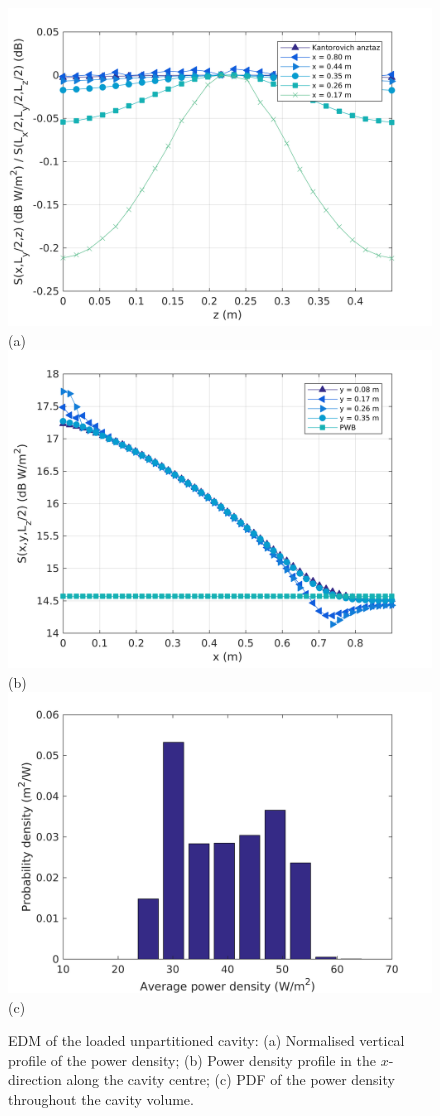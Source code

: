 \documentclass[a4paper]{article}
\numberwithin{equation}{section}
\begin{document}
\begin{figure}[ht]
\begin{center}
\includegraphics[width=0.6\linewidth]{figures/SDM_3D_SL_PowerDensityProfileZ}\\
{\footnotesize (a)}\\
\vspace{2mm}
\includegraphics[width=0.6\linewidth]{figures/SDM_3D_SL_PowerDensityProfileX}\\
{\footnotesize (b)}\\
\vspace{2mm}
\includegraphics[width=0.6\linewidth]{figures/SDM_3D_SL_PowerDensityPDF}\\
{\footnotesize (c)}\\
\vspace{-2mm}
\caption{\label{fg:unpartcyl_profs} EDM of the loaded unpartitioned cavity: (a) Normalised vertical profile of the power density; 
(b) Power density profile in the $x$-direction along the cavity centre; (c) PDF of the power density throughout the cavity volume.}
\end{center}
\end{figure}
\end{document}
